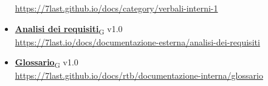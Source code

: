 \begin{itemize}
        \url{https://7last.github.io/docs/category/verbali-interni-1}
    \item \href{https://7last.github.io/docs/rtb/documentazione-interna/glossario\#analisi-dei-requisiti}{\textbf{Analisi dei requisiti}\textsubscript{G}} v1.0\\
        \url{https://7last.io/docs/documentazione-esterna/analisi-dei-requisiti}
    \item \href{https://7last.github.io/docs/rtb/documentazione-interna/glossario\#glossario}{\textbf{Glossario}\textsubscript{G}} v1.0\\
        \url{https://7last.github.io/docs/rtb/documentazione-interna/glossario}
\end{itemize}